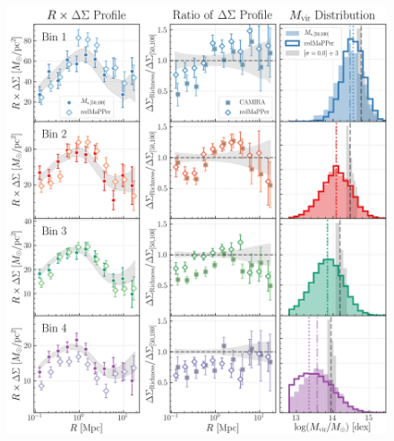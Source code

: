 \documentclass[a4paper,fleqn,usenatbib]{mnras}
\begin{document}
  \begin{figure}
      \centering
      \includegraphics[width=\textwidth]{figure/topn_dsigma_mout6_redm_compare}
      \caption{
          }
      \label{fig:mout_richness}
  \end{figure}
\end{document}
